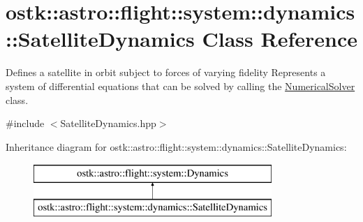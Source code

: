 \hypertarget{classostk_1_1astro_1_1flight_1_1system_1_1dynamics_1_1_satellite_dynamics}{}\section{ostk\+:\+:astro\+:\+:flight\+:\+:system\+:\+:dynamics\+:\+:Satellite\+Dynamics Class Reference}
\label{classostk_1_1astro_1_1flight_1_1system_1_1dynamics_1_1_satellite_dynamics}


Defines a satellite in orbit subject to forces of varying fidelity Represents a system of differential equations that can be solved by calling the \hyperlink{classostk_1_1astro_1_1_numerical_solver}{Numerical\+Solver} class.  




{\ttfamily \#include $<$Satellite\+Dynamics.\+hpp$>$}

Inheritance diagram for ostk\+:\+:astro\+:\+:flight\+:\+:system\+:\+:dynamics\+:\+:Satellite\+Dynamics\+:\begin{figure}[H]
\begin{center}
\leavevmode
\includegraphics[height=2.000000cm]{classostk_1_1astro_1_1flight_1_1system_1_1dynamics_1_1_satellite_dynamics}
\end{center}
\end{figure}
